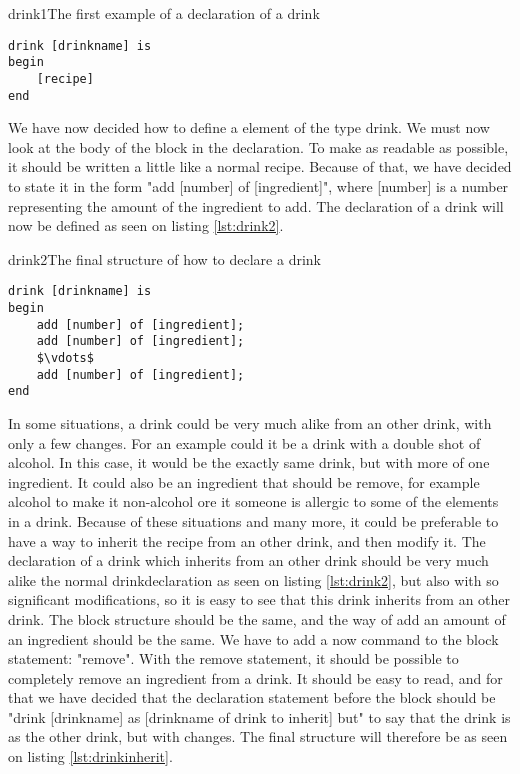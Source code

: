 \begin{code}{drink1}{The first example of a declaration of a drink}
\begin{lstlisting}
drink [drinkname] is
begin
	[recipe]
end
\end{lstlisting}
\end{code}

We have now decided how to define a element of the type drink. We must now look at the body of the block in the declaration. To make as readable as possible, it should be written a little like a normal recipe. Because of that, we have decided to state it in the form "add [number] of [ingredient]", where [number] is a number representing the amount of the ingredient to add. The declaration of a drink will now be defined as seen on listing \ref{lst:drink2}.

\begin{code}{drink2}{The final structure of how to declare a drink}
\begin{lstlisting}[mathescape]
drink [drinkname] is
begin
	add [number] of [ingredient];
	add [number] of [ingredient];
	$\vdots$
	add [number] of [ingredient];
end
\end{lstlisting}
\end{code}

In some situations, a drink could be very much alike from an other drink, with only a few changes. For an example could it be a drink with a double shot of alcohol. In this case, it would be the exactly same drink, but with more of one ingredient. It could also be an ingredient that should be remove, for example alcohol to make it non-alcohol ore it someone is allergic to some of the elements in a drink. Because of these situations and many more, it could be preferable to have a way to inherit the recipe from an other drink, and then modify it. The declaration of a drink which inherits from an other drink should be very much alike the normal drinkdeclaration as seen on listing \ref{lst:drink2}, but also with so significant modifications, so it is easy to see that this drink inherits from an other drink. The block structure should be the same, and the way of add an amount of an ingredient should be the same. We have to add a now command to the block statement: "remove". With the remove statement, it should be possible to completely remove an ingredient from a drink. It should be easy to read, and for that we have decided that the declaration statement before the block should be "drink [drinkname] as [drinkname of drink to inherit] but" to say that the drink is as the other drink, but with changes. The final structure will therefore be as seen on listing \ref{lst:drinkinherit}.

